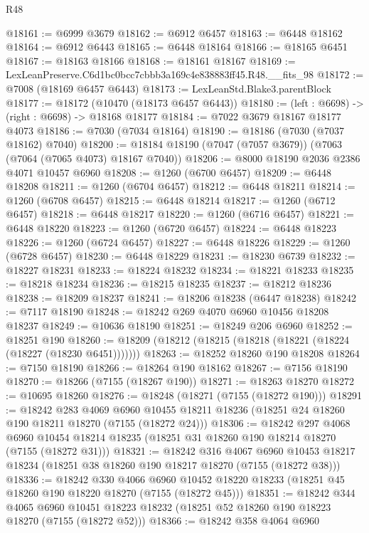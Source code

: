 \begin{lexlean}{R48}
\begin{coremodule}
@18161 := @6999 @3679
@18162 := @6912 @6457
@18163 := @6448 @18162
@18164 := @6912 @6443
@18165 := @6448 @18164
@18166 := @18165 @6451
@18167 := @18163 @18166
@18168 := @18161 @18167
@18169 := LexLeanPreserve.C6d1bc0bcc7cbbb3a169c4e838883ff45.R48.__fits_98
@18172 := @7008 (@18169 @6457 @6443)
@18173 := LexLeanStd.Blake3.parentBlock
@18177 := @18172 (@10470 (@18173 @6457 @6443))
@18180 := (left : @6698) -> (right : @6698) -> @18168 @18177
@18184 := @7022 @3679 @18167 @18177 @4073
@18186 := @7030 (@7034 @18164)
@18190 := @18186 (@7030 (@7037 @18162) @7040)
@18200 := @18184 @18190 (@7047 (@7057 @3679)) (@7063 (@7064 (@7065 @4073) @18167 @7040))
@18206 := @8000 @18190 @2036 @2386 @4071 @10457 @6960
@18208 := @1260 (@6700 @6457)
@18209 := @6448 @18208
@18211 := @1260 (@6704 @6457)
@18212 := @6448 @18211
@18214 := @1260 (@6708 @6457)
@18215 := @6448 @18214
@18217 := @1260 (@6712 @6457)
@18218 := @6448 @18217
@18220 := @1260 (@6716 @6457)
@18221 := @6448 @18220
@18223 := @1260 (@6720 @6457)
@18224 := @6448 @18223
@18226 := @1260 (@6724 @6457)
@18227 := @6448 @18226
@18229 := @1260 (@6728 @6457)
@18230 := @6448 @18229
@18231 := @18230 @6739
@18232 := @18227 @18231
@18233 := @18224 @18232
@18234 := @18221 @18233
@18235 := @18218 @18234
@18236 := @18215 @18235
@18237 := @18212 @18236
@18238 := @18209 @18237
@18241 := @18206 @18238 (@6447 @18238)
@18242 := @7117 @18190
@18248 := @18242 @269 @4070 @6960 @10456 @18208 @18237
@18249 := @10636 @18190
@18251 := @18249 @206 @6960
@18252 := @18251 @190
@18260 := @18209 (@18212 (@18215 (@18218 (@18221 (@18224 (@18227 (@18230 @6451)))))))
@18263 := @18252 @18260 @190 @18208
@18264 := @7150 @18190
@18266 := @18264 @190 @18162
@18267 := @7156 @18190
@18270 := @18266 (@7155 (@18267 @190))
@18271 := @18263 @18270
@18272 := @10695 @18260
@18276 := @18248 (@18271 (@7155 (@18272 @190)))
@18291 := @18242
    @283
    @4069
    @6960
    @10455
    @18211
    @18236
    (@18251 @24 @18260 @190 @18211 @18270 (@7155 (@18272 @24)))
@18306 := @18242
    @297
    @4068
    @6960
    @10454
    @18214
    @18235
    (@18251 @31 @18260 @190 @18214 @18270 (@7155 (@18272 @31)))
@18321 := @18242
    @316
    @4067
    @6960
    @10453
    @18217
    @18234
    (@18251 @38 @18260 @190 @18217 @18270 (@7155 (@18272 @38)))
@18336 := @18242
    @330
    @4066
    @6960
    @10452
    @18220
    @18233
    (@18251 @45 @18260 @190 @18220 @18270 (@7155 (@18272 @45)))
@18351 := @18242
    @344
    @4065
    @6960
    @10451
    @18223
    @18232
    (@18251 @52 @18260 @190 @18223 @18270 (@7155 (@18272 @52)))
@18366 := @18242
    @358
    @4064
    @6960

\end{coremodule}
\end{lexlean}
